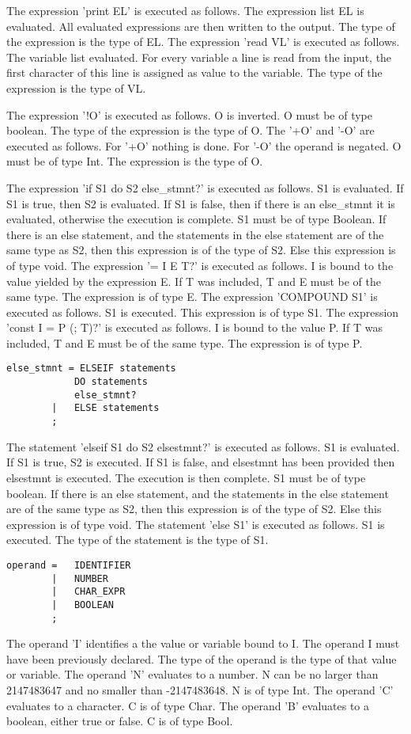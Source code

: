 \documentclass[paper=a4, fontsize=11pt]{article}
\numberwithin{equation}{section}		%
\numberwithin{figure}{section}			%
\numberwithin{table}{section}				%
\begin{document}
The expression 'print EL' is executed as follows. The expression list EL is evaluated. All evaluated expressions are then written to the output. The type of the expression is the type of EL.
The expression 'read VL' is executed as follows. The variable list evaluated. For every variable a line is read from the input, the first character of this line is assigned as value to the variable. The type of the expression is the type of VL.

The expression '!O'  is executed as follows. O is inverted. O must be of type boolean. The type of the expression is the type of O.
The '+O' and '-O' are executed as follows. For '+O' nothing is done. For '-O' the operand is negated. O must be of type Int. The expression is the type of O.

The expression 'if S1 do S2 else\_stmnt?' is executed as follows. S1 is evaluated. If S1 is true, then S2 is evaluated. If S1 is false, then if there is an else\_stmnt it is evaluated, otherwise the execution is complete. S1 must be of type Boolean. If there is an else statement, and the statements in the else statement are of the same type as S2, then this expression is of the type of S2. Else this expression is of type void.
The expression '= I E T?' is executed as follows. I is bound to the value yielded by the expression E. If T was included, T and E must be of the same type. The expression is of type E.
The expression 'COMPOUND S1' is executed as follows. S1 is executed. This expression is of type S1.
The expression 'const I = P (; T)?' is executed as follows. I is bound to the value P. If T was included, T and E must be of the same type. The expression is of type P.

\begin{verbatim}
else_stmnt = ELSEIF statements
			DO statements
			else_stmnt?
		|	ELSE statements
	   	;
\end{verbatim}
The statement 'elseif S1 do S2 elsestmnt?' is executed as follows. S1 is evaluated. If S1 is true, S2 is executed. If S1 is false, and elsestmnt has been provided then elsestmnt is executed. The execution is then complete. S1 must be of type boolean. If there is an else statement, and the statements in the else statement are of the same type as S2, then this expression is of the type of S2. Else this expression is of type void.
The statement 'else S1' is executed as follows. S1 is executed. The type of the statement is the type of S1.

\begin{verbatim}
operand = 	IDENTIFIER
		|	NUMBER
		| 	CHAR_EXPR
		|	BOOLEAN
		;
\end{verbatim}
The operand 'I' identifies a the value or variable bound to I. The operand I must have been previously declared. The type of the operand is the type of that value or variable.
The operand 'N' evaluates to a number. N can be no larger than 2147483647 and no smaller than -2147483648. N is of type Int.
The operand 'C' evaluates to a character. C is of type Char.
The operand 'B' evaluates to a boolean, either true or false. C is of type Bool.
\end{document}

